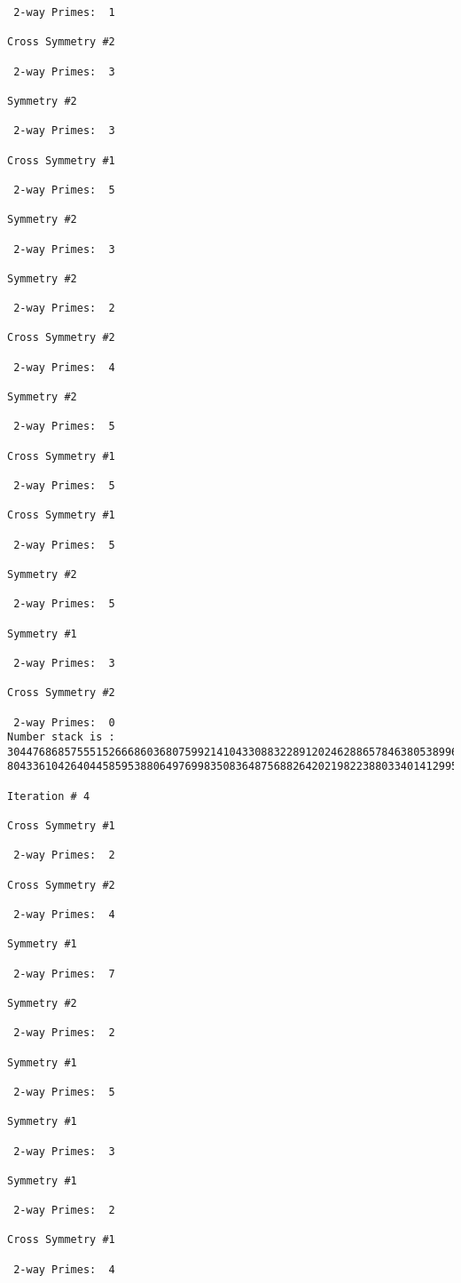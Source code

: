 {{{{\begin{verbatim}
 2-way Primes: 	1

Cross Symmetry #2

 2-way Primes: 	3

Symmetry #2

 2-way Primes: 	3

Cross Symmetry #1

 2-way Primes: 	5

Symmetry #2

 2-way Primes: 	3

Symmetry #2

 2-way Primes: 	2

Cross Symmetry #2

 2-way Primes: 	4

Symmetry #2

 2-way Primes: 	5

Cross Symmetry #1

 2-way Primes: 	5

Cross Symmetry #1

 2-way Primes: 	5

Symmetry #2

 2-way Primes: 	5

Symmetry #1

 2-way Primes: 	3

Cross Symmetry #2

 2-way Primes: 	0
Number stack is :
30447686857555152666860368075992141043308832289120246288657846380538996794608835958544046240163340857
80433610426404458595388064976998350836487568826420219822388033401412995708630686662515557586867440375

Iteration #	4

Cross Symmetry #1

 2-way Primes: 	2

Cross Symmetry #2

 2-way Primes: 	4

Symmetry #1

 2-way Primes: 	7

Symmetry #2

 2-way Primes: 	2

Symmetry #1

 2-way Primes: 	5

Symmetry #1

 2-way Primes: 	3

Symmetry #1

 2-way Primes: 	2

Cross Symmetry #1

 2-way Primes: 	4


\end{verbatim}}}}}
